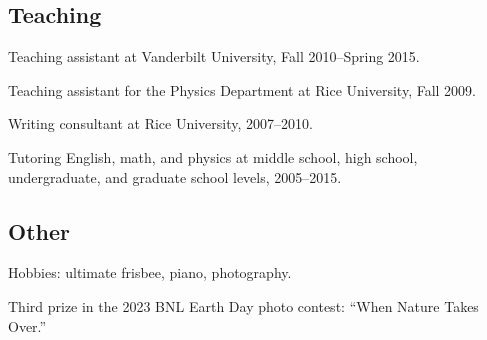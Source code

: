 \documentclass{article}
\renewenvironment{itemize}{
\begin{list}{}{
\setlength{\leftmargin}{.5em}}}{
\end{list}}
\begin{document}
\subsection*{Teaching}
\begin{itemize}
\item Teaching assistant at Vanderbilt University, Fall 2010--Spring 2015.
\item Teaching assistant for the Physics Department at Rice University, Fall 2009.
\item Writing consultant at Rice University, 2007--2010.
\item Tutoring English, math, and physics at middle school, high school, undergraduate, and graduate school levels, 2005--2015.
\end{itemize}

\subsection*{Other}
\begin{itemize}
\item Hobbies: ultimate frisbee, piano, photography.
\item Third prize in the 2023 BNL Earth Day photo contest: ``When Nature Takes Over.''
\end{itemize}
\end{document}

